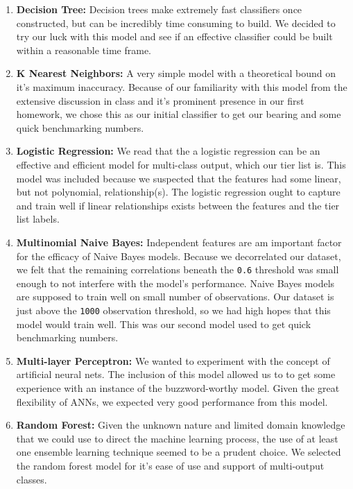 \documentclass[12pt]{diazessay}
\begin{document}
\begin{enumerate}
\def\labelenumi{\arabic{enumi}.}
\item
  \textbf{Decision Tree:} Decision trees make extremely fast classifiers
  once constructed, but can be incredibly time consuming to build.
  We decided to try our luck with this model and see if an effective
  classifier could be built within a reasonable time frame.
\item
  \textbf{K Nearest Neighbors:} A very simple model with a theoretical bound on it's maximum inaccuracy.
  Because of our familiarity with this model from the extensive discussion in class and it's prominent presence in our first homework, we chose this as our initial classifier to get our bearing and some quick benchmarking numbers.
\item
  \textbf{Logistic Regression:} We read that the a logistic regression
  can be an effective and efficient model for multi-class output, which
  our tier list is. This model was included because we suspected that
  the features had some linear, but not polynomial, relationship(s). The
  logistic regression ought to capture and train well if linear
  relationships exists between the features and the tier list labels.
\item
  \textbf{Multinomial Naive Bayes:} Independent features are am important
  factor for the efficacy of Naive Bayes models. Because we decorrelated
  our dataset, we felt that the remaining correlations beneath the
  \texttt{0.6} threshold was small enough to not interfere with the
  model's performance. Naive Bayes models are supposed to train well on
  small number of observations. Our dataset is just above the
  \texttt{1000} observation threshold, so we had high hopes that this
  model would train well. This was our second model used to get quick
  benchmarking numbers.
\item
  \textbf{Multi-layer Perceptron:} We wanted to experiment with the
  concept of artificial neural nets. The inclusion of this model allowed
  us to to get some experience with an instance of the buzzword-worthy
  model. Given the great flexibility of ANNs, we expected very good
  performance from this model.
\item
  \textbf{Random Forest:} Given the unknown nature and limited domain
  knowledge that we could use to direct the machine learning process,
  the use of at least one ensemble learning technique seemed to be a
  prudent choice. We selected the random forest model for it's ease of
  use and support of multi-output classes.

\end{enumerate}
\end{document}
